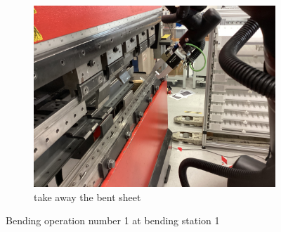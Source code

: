 \begin{figure}[h]
    \begin{subfigure}[b]{0.32\textwidth}
        \centering
        \includegraphics[width=\textwidth]{figures/bending/bending1-001.png}
        \caption{take away the bent sheet}
        \label{subfig:bending1-after}
    \end{subfigure}\hspace{0.1cm}
    \caption{Bending operation number 1 at bending station 1}
    \label{fig:bending-operation-1}
\end{figure}

